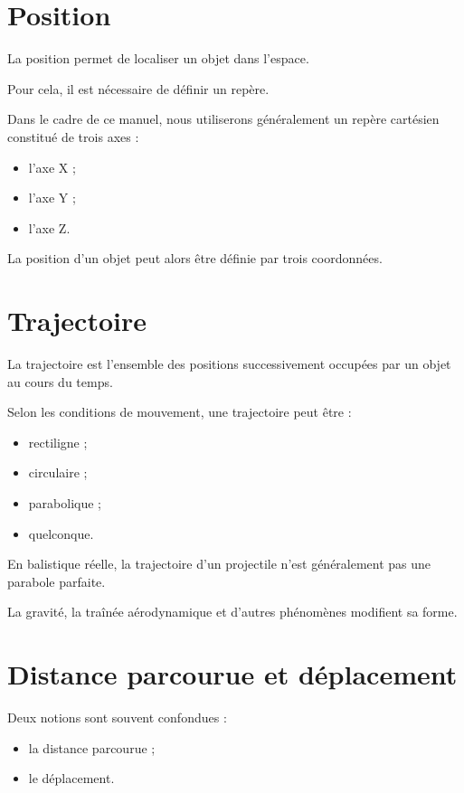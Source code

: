 \section{Position}

La position permet de localiser un objet dans l'espace.

Pour cela, il est nécessaire de définir un repère.

Dans le cadre de ce manuel, nous utiliserons généralement un repère
cartésien constitué de trois axes :

\begin{itemize}
    \item l'axe X ;
    \item l'axe Y ;
    \item l'axe Z.
\end{itemize}

La position d'un objet peut alors être définie par trois coordonnées.

\section{Trajectoire}

La trajectoire est l'ensemble des positions successivement occupées par un
objet au cours du temps.

Selon les conditions de mouvement, une trajectoire peut être :

\begin{itemize}
    \item rectiligne ;
    \item circulaire ;
    \item parabolique ;
    \item quelconque.
\end{itemize}

En balistique réelle, la trajectoire d'un projectile n'est généralement pas
une parabole parfaite.

La gravité, la traînée aérodynamique et d'autres phénomènes modifient sa
forme.

\section{Distance parcourue et déplacement}

Deux notions sont souvent confondues :

\begin{itemize}
    \item la distance parcourue ;
    \item le déplacement.
\end{itemize}

